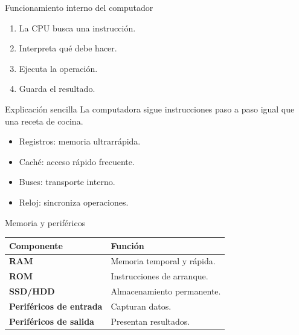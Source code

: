 \documentclass[10pt, aspectratio=169]{beamer}
\begin{document}
	\begin{frame}{Funcionamiento interno del computador}
		
		\small
		
		\begin{enumerate}
			\item La CPU busca una instrucción.
			\item Interpreta qué debe hacer.
			\item Ejecuta la operación.
			\item Guarda el resultado.
		\end{enumerate}
		
		\vspace{0.4cm}
		
		\begin{block}{Explicación sencilla}
			La computadora sigue instrucciones paso a paso igual que una receta de cocina.
		\end{block}
		
		\vspace{0.2cm}
		
		\begin{itemize}
			\item Registros: memoria ultrarrápida.
			\item Caché: acceso rápido frecuente.
			\item Buses: transporte interno.
			\item Reloj: sincroniza operaciones.
		\end{itemize}
		
	\end{frame}
	
	\begin{frame}{Memoria y periféricos}
		
		\small
		
		\begin{center}
			
			\begin{tabular}{>{\bfseries}p{3cm} p{8cm}}
				
				\toprule
				Componente & Función \\
				\midrule
				RAM & Memoria temporal y rápida. \\
				ROM & Instrucciones de arranque. \\
				SSD/HDD & Almacenamiento permanente. \\
				Periféricos de entrada & Capturan datos. \\
				Periféricos de salida & Presentan resultados. \\
				\bottomrule
				
			\end{tabular}
			
		\end{center}
		
	\end{frame}
	
\end{document}
